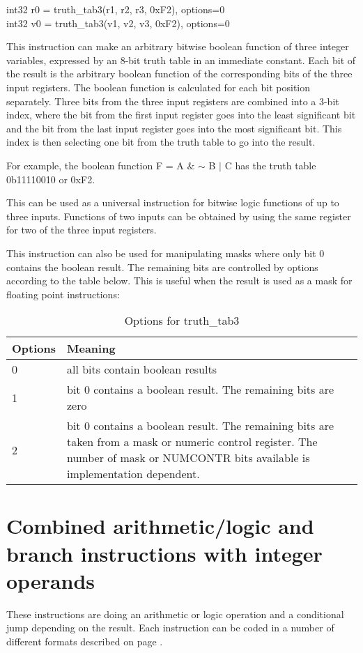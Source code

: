 \documentclass[forwardcom.tex]{subfiles}
\begin{document}
int32 r0 = truth\_tab3(r1, r2, r3, 0xF2), options=0 \\
int32 v0 = truth\_tab3(v1, v2, v3, 0xF2), options=0
\vv

This instruction can make an arbitrary bitwise boolean function of three integer variables, expressed by an 8-bit truth table in an immediate constant. Each bit of the result is the arbitrary boolean function of the corresponding bits of the three input registers. The boolean function is calculated for each bit position separately. Three bits from the three input registers are combined into a 3-bit index, where the bit from the first input register goes into the least significant bit and the bit from the last input register goes into the most significant bit. This index is then selecting one bit from the truth table to go into the result.
\vv

For example, the boolean function F = A $\&$ $\sim$ B $|$ C has the truth table 0b11110010 or 0xF2. 
\vv

This can be used as a universal instruction for bitwise logic functions of up to three inputs. Functions of two inputs can be obtained by using the same register for two of the three input registers.
\vv

This instruction can also be used for manipulating masks where only bit 0 contains the boolean result. The remaining bits are controlled by options according to the table below. This is useful when the result is used as a mask for floating point instructions:

\begin{longtable} {|p{20mm}|p{75mm}|}
\caption{Options for truth\_tab3} 
\label{table:OptionsForTruthTab3} \\
\endfirsthead
\endhead
\hline
\bfseries Options & \bfseries Meaning   \\
\hline
0 & all bits contain boolean results \\ \hline
1 & bit 0 contains a boolean result. The remaining bits are zero \\ \hline
2 & bit 0 contains a boolean result. The remaining bits are taken from a mask or numeric control register. The number of mask or NUMCONTR bits available is implementation dependent. \\ \hline
\end{longtable}
\vv


\section{Combined arithmetic/logic and branch instructions with integer operands}
\label{descriptionOfControlTransferInstructions}
These instructions are doing an arithmetic or logic operation and a conditional jump
depending on the result. Each instruction can be coded in a number of different formats
described on page \pageref{table:jumpInstructionFormats}.
\vv
\end{document}
